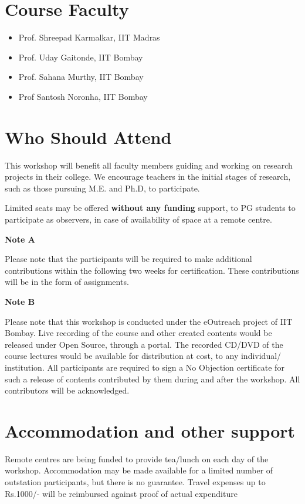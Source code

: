 \documentclass[notuble,10pt,a4paper]{leaflet}
\begin{document}
\section{\Large{Course Faculty}}

\begin{itemize}
\item Prof. Shreepad Karmalkar, IIT Madras
\item Prof. Uday Gaitonde, IIT Bombay
\item Prof. Sahana Murthy, IIT Bombay
\item Prof Santosh Noronha, IIT Bombay
\end{itemize}
 
\section{{\Large Who Should Attend}}
This workshop will benefit all faculty members guiding and working on research projects in their college. We encourage teachers in the initial stages of research, such as those pursuing M.E. and Ph.D, to participate.

Limited seats may be offered \textbf{without any funding} support, to PG students to participate as observers, in case of availability of space at a remote centre.

\textbf{Note A}

Please note that the participants  will be required to make additional contributions within the following two weeks for certification. These contributions will be in the form of assignments.

\textbf{Note B}

Please note that this workshop is conducted under the eOutreach project of IIT Bombay. Live recording of the course and other created contents would be released under Open Source, through a portal. The recorded CD/DVD of the course lectures would be available for distribution at cost, to any individual/ institution. All participants are required to sign a No Objection certificate for such a release of contents contributed by them during and after the workshop. All contributors will be acknowledged.


\section{{\Large Accommodation and other support}}

Remote centres are being funded to provide tea/lunch on each day of the workshop. Accommodation may be made available for a limited number of outstation participants, but there is no guarantee. Travel expenses up to Rs.1000/- will be reimbursed against proof of actual expenditure
\end{document}
